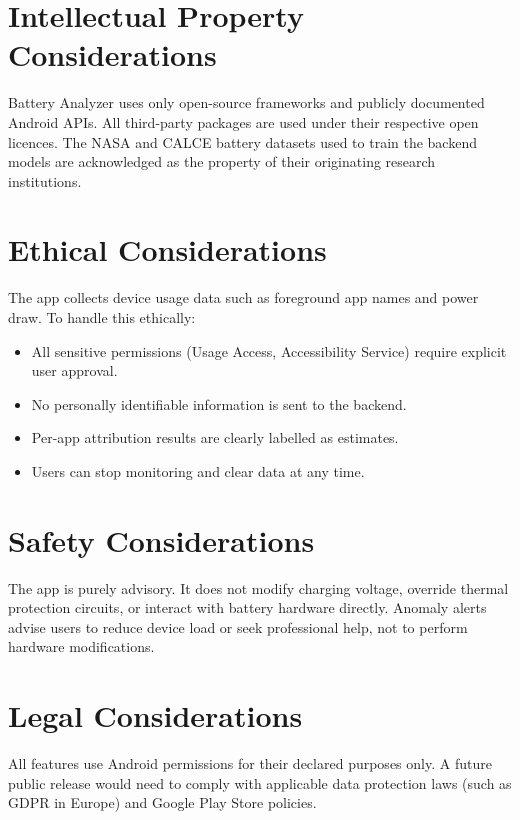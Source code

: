 \documentclass[12pt,a4paper]{report}
\begin{document}
\section{Intellectual Property Considerations}

Battery Analyzer uses only open-source frameworks and publicly documented Android
APIs. All third-party packages are used under their respective open licences. The
NASA and CALCE battery datasets used to train the backend models are acknowledged
as the property of their originating research institutions.

\section{Ethical Considerations}

The app collects device usage data such as foreground app names and power draw.
To handle this ethically:
\begin{itemize}[leftmargin=1.5em]
  \item All sensitive permissions (Usage Access, Accessibility Service) require
        explicit user approval.
  \item No personally identifiable information is sent to the backend.
  \item Per-app attribution results are clearly labelled as estimates.
  \item Users can stop monitoring and clear data at any time.
\end{itemize}

\section{Safety Considerations}

The app is purely advisory. It does not modify charging voltage, override thermal
protection circuits, or interact with battery hardware directly. Anomaly alerts
advise users to reduce device load or seek professional help, not to perform
hardware modifications.

\section{Legal Considerations}

All features use Android permissions for their declared purposes only. A future
public release would need to comply with applicable data protection laws (such as
GDPR in Europe) and Google Play Store policies.
\end{document}
